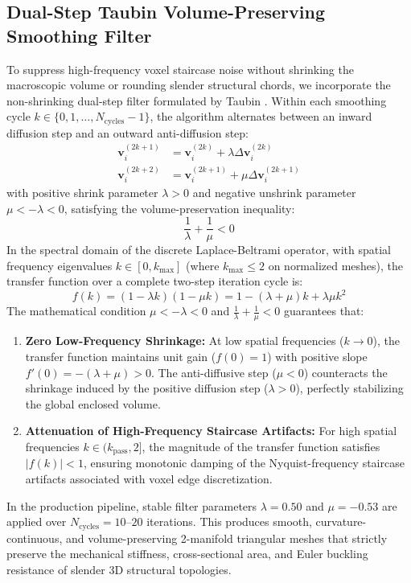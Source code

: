 \documentclass[11pt, a4paper]{article}
\begin{document}
\subsection{Dual-Step Taubin Volume-Preserving Smoothing Filter}
To suppress high-frequency voxel staircase noise without shrinking the macroscopic volume or rounding slender structural chords, we incorporate the non-shrinking dual-step filter formulated by Taubin \cite{taubin1995}. Within each smoothing cycle $k \in \{0, 1, \dots, N_{\text{cycles}}-1\}$, the algorithm alternates between an inward diffusion step and an outward anti-diffusion step:
\begin{align}
\mathbf{v}_i^{(2k+1)} &= \mathbf{v}_i^{(2k)} + \lambda \Delta \mathbf{v}_i^{(2k)} \\
\mathbf{v}_i^{(2k+2)} &= \mathbf{v}_i^{(2k+1)} + \mu \Delta \mathbf{v}_i^{(2k+1)}
\end{align}
with positive shrink parameter $\lambda > 0$ and negative unshrink parameter $\mu < -\lambda < 0$, satisfying the volume-preservation inequality:
\begin{equation}
\frac{1}{\lambda} + \frac{1}{\mu} < 0
\end{equation}
In the spectral domain of the discrete Laplace-Beltrami operator, with spatial frequency eigenvalues $k \in [0, k_{\max}]$ (where $k_{\max} \le 2$ on normalized meshes), the transfer function over a complete two-step iteration cycle is:
\begin{equation}
f(k) = (1 - \lambda k)(1 - \mu k) = 1 - (\lambda + \mu) k + \lambda \mu k^2
\end{equation}
The mathematical condition $\mu < -\lambda < 0$ and $\frac{1}{\lambda} + \frac{1}{\mu} < 0$ guarantees that:
\begin{enumerate}
    \item \textbf{Zero Low-Frequency Shrinkage:} At low spatial frequencies ($k \to 0$), the transfer function maintains unit gain ($f(0) = 1$) with positive slope $f'(0) = -(\lambda + \mu) > 0$. The anti-diffusive step ($\mu < 0$) counteracts the shrinkage induced by the positive diffusion step ($\lambda > 0$), perfectly stabilizing the global enclosed volume.
    \item \textbf{Attenuation of High-Frequency Staircase Artifacts:} For high spatial frequencies $k \in (k_{\text{pass}}, 2]$, the magnitude of the transfer function satisfies $|f(k)| < 1$, ensuring monotonic damping of the Nyquist-frequency staircase artifacts associated with voxel edge discretization.
\end{enumerate}
In the production pipeline, stable filter parameters $\lambda = 0.50$ and $\mu = -0.53$ are applied over $N_{\text{cycles}} = 10 \text{--} 20$ iterations. This produces smooth, curvature-continuous, and volume-preserving 2-manifold triangular meshes that strictly preserve the mechanical stiffness, cross-sectional area, and Euler buckling resistance of slender 3D structural topologies.
\end{document}
